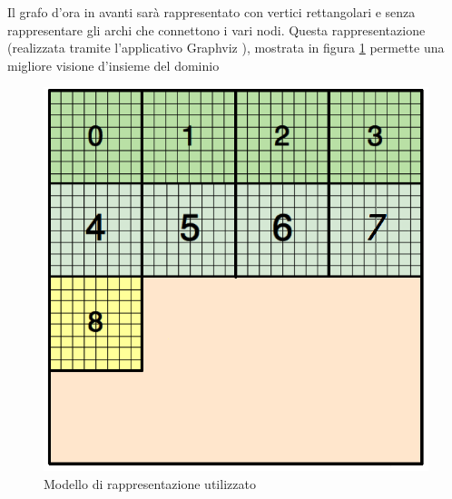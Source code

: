 Il grafo d'ora in avanti sarà rappresentato con vertici rettangolari e senza rappresentare gli archi che connettono i vari nodi. Questa rappresentazione (realizzata tramite l'applicativo Graphviz \cite{graphviz}), mostrata in figura \ref{fig:square_graph} permette una migliore visione d'insieme del dominio
\begin{figure}[H]
	\centering
	\includegraphics[width=1.0\linewidth]{immagini/block_on_grid.png}
	\caption{Modello di rappresentazione utilizzato}
	\label{fig:square_graph}
\end{figure}

